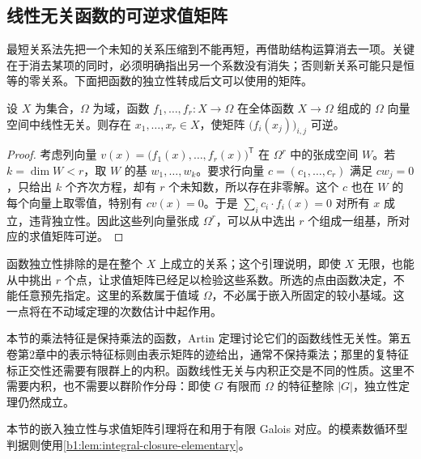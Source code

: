 \subsection{线性无关函数的可逆求值矩阵}
\label{b1:subsec:1801:04}

最短关系法先把一个未知的关系压缩到不能再短，再借助结构运算消去一项。关键在于消去某项的同时，必须明确指出另一个系数没有消失；否则新关系可能只是恒等的零关系。下面把函数的独立性转成后文可以使用的矩阵。

\begin{lemma}\label{b1:lem:independent-functions-evaluation}
	设 \(X\) 为集合，\(\Omega\) 为域，函数 \(f_1,\ldots,f_r:X\rightarrow\Omega\) 在全体函数 \(X\rightarrow\Omega\) 组成的 \(\Omega\) 向量空间中线性无关。则存在 \(x_1,\ldots,x_r\in X\)，使矩阵 \(\bigl(f_i(x_j)\bigr)_{i,j}\) 可逆。
\end{lemma}
\begin{proof}
	考虑列向量 \(v(x)=\bigl(f_1(x),\ldots,f_r(x)\bigr)^{\mathsf T}\) 在 \(\Omega^r\) 中的张成空间 \(W\)。若 \(k=\dim W<r\)，取 \(W\) 的基 \(w_1,\ldots,w_k\)。要求行向量 \(c=(c_1,\ldots,c_r)\) 满足 \(cw_j=0\)，只给出 \(k\) 个齐次方程，却有 \(r\) 个未知数，所以存在非零解。这个 \(c\) 也在 \(W\) 的每个向量上取零值，特别有 \(cv(x)=0\)。于是 \(\sum_i c_i\cdot f_i(x)=0\) 对所有 \(x\) 成立，违背独立性。因此这些列向量张成 \(\Omega^r\)，可以从中选出 \(r\) 个组成一组基，所对应的求值矩阵可逆。
\end{proof}
函数独立性排除的是在整个 \(X\) 上成立的关系；这个引理说明，即使 \(X\) 无限，也能从中挑出 \(r\) 个点，让求值矩阵已经足以检验这些系数。所选的点由函数决定，不能任意预先指定。这里的系数属于值域 \(\Omega\)，不必属于嵌入所固定的较小基域。这一点将在不动域定理的次数估计中起作用。

\ProseParagraphBreak
本节的乘法特征是保持乘法的函数，Artin 定理讨论它们的函数线性无关性。第五卷第2章中的表示特征标则由表示矩阵的迹给出，通常不保持乘法；那里的复特征标正交性还需要有限群上的内积。函数线性无关与内积正交是不同的性质。这里不需要内积，也不需要以群阶作分母：即使 \(G\) 有限而 \(\Omega\) 的特征整除 \(|G|\)，独立性定理仍然成立。

\ProseParagraphBreak
本节的嵌入独立性与求值矩阵引理将在和用于有限 Galois 对应。的模素数循环型判据则使用\cref{b1:lem:integral-closure-elementary}。
